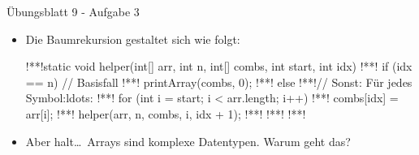 \begin{frame}[fragile]{Übungsblatt 9 - Aufgabe 3}
    \begin{itemize}[<+(1)->]
        \itemsep6pt
        \item Die Baumrekursion gestaltet sich wie folgt:\pause
\begin{plainjava}
!**!static void helper(int[] arr, int n, int[] combs, int start, int idx) {
!**!    if (idx == n) { // Basisfall
!**!        printArray(combs, 0);
!**!    } else { !**!// Sonst: Für jedes Symbol:ldots:
!**!        for (int i = start; i < arr.length; i++) {
!**!            combs[idx] = arr[i];
!**!            helper(arr, n, combs, i, idx + 1);
!**!        }
!**!    }
!**!}
\end{plainjava}
        \item<9-> Aber halt\ldots\ Arrays sind komplexe Datentypen. Warum geht das? 
    \end{itemize}
\end{frame}

